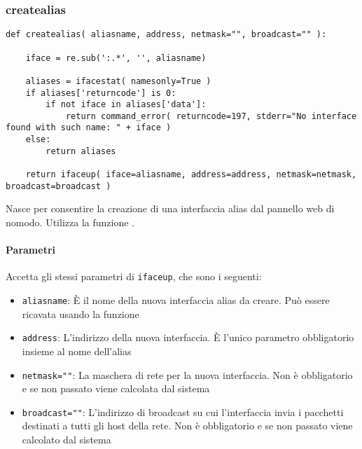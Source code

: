 \documentclass[11pt]{article}
\begin{document}
\subsubsection{createalias}\label{createalias}
\begin{lstlisting}
def createalias( aliasname, address, netmask="", broadcast="" ):

    iface = re.sub(':.*', '', aliasname)

    aliases = ifacestat( namesonly=True )
    if aliases['returncode'] is 0:
        if not iface in aliases['data']:
            return command_error( returncode=197, stderr="No interface found with such name: " + iface )
    else:
        return aliases

    return ifaceup( iface=aliasname, address=address, netmask=netmask, broadcast=broadcast )
\end{lstlisting}
Nasce per consentire la creazione di una interfaccia alias dal pannello web di nomodo.
Utilizza la funzione .
\paragraph{Parametri}
Accetta gli stessi parametri di \texttt{ifaceup}, che sono i seguenti:
\begin{itemize}
	\item{\texttt{aliasname}: È  il nome della nuova interfaccia alias da creare. Può essere ricavata usando
		la funzione }
	\item{\texttt{address}: L'indirizzo della nuova interfaccia. È l'unico parametro obbligatorio
		insieme al nome dell'alias}
	\item{\texttt{netmask=""}: La maschera di rete per la nuova interfaccia. Non è obbligatorio e se
		non passato viene calcolata dal sistema}
	\item{\texttt{broadcast=""}: L'indirizzo di broadcast su cui l'interfaccia invia i pacchetti destinati
		a tutti gli host della rete. Non è obbligatorio e se non passato viene calcolato dal sistema}
\end{itemize}
\end{document}
